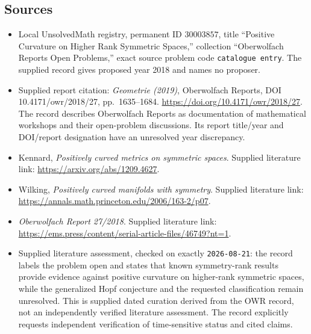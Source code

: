 \documentclass[11pt]{article}
\begin{document}
\subsection{Sources}
\begin{itemize}
\item Local UnsolvedMath registry, permanent ID \(30003857\), title ``Positive Curvature on Higher Rank Symmetric Spaces,'' collection ``Oberwolfach Reports Open Problems,'' exact source problem code \texttt{catalogue entry}. The supplied record gives proposed year 2018 and names no proposer.
\item Supplied report citation: \emph{Geometrie (2019)}, Oberwolfach Reports, DOI 10.4171/owr/2018/27, pp.\ 1635--1684. \url{https://doi.org/10.4171/owr/2018/27}. The record describes Oberwolfach Reports as documentation of mathematical workshops and their open-problem discussions. Its report title/year and DOI/report designation have an unresolved year discrepancy.
\item Kennard, \emph{Positively curved metrics on symmetric spaces}. Supplied literature link: \url{https://arxiv.org/abs/1209.4627}.
\item Wilking, \emph{Positively curved manifolds with symmetry}. Supplied literature link: \url{https://annals.math.princeton.edu/2006/163-2/p07}.
\item \emph{Oberwolfach Report 27/2018}. Supplied literature link: \url{https://ems.press/content/serial-article-files/46749?nt=1}.
\item Supplied literature assessment, checked on exactly \texttt{2026-08-21}: the record labels the problem open and states that known symmetry-rank results provide evidence against positive curvature on higher-rank symmetric spaces, while the generalized Hopf conjecture and the requested classification remain unresolved. This is supplied dated curation derived from the OWR record, not an independently verified literature assessment. The record explicitly requests independent verification of time-sensitive status and cited claims.
\end{itemize}
\end{document}
